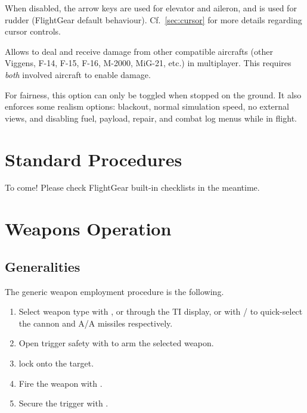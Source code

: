 \documentclass[a4paper]{report}
\begin{document}
\begin{description}
    When disabled, the arrow keys are used for elevator and aileron,
    and \keys{\return} is used for rudder (FlightGear default behaviour).
    Cf.\ \cref{sec:cursor} for more details regarding cursor controls.
  \item[\menu{Enable multiplayer damage}]
    Allows to deal and receive damage from other compatible aircrafts
    (other Viggens, F-14, F-15, F-16, M-2000, MiG-21, etc.) in multiplayer.
    This requires \emph{both} involved aircraft to enable damage.

    For fairness, this option can only be toggled when stopped on the ground.
    It also enforces some realism options: blackout, normal simulation speed,
    no external views, and disabling fuel, payload, repair, and combat log menus while in flight.
\end{description}


\chapter{Standard Procedures}
To come! Please check FlightGear built-in checklists
 in the meantime.


\chapter{Weapons Operation}
\label{chap:weapons}
\section{Generalities}
The generic weapon employment procedure is the following.
\begin{enumerate}
  \item Select weapon type with ,
    {or through the TI display, or with  / 
     to quick-select the cannon and A/A missiles respectively.}
  \item Open trigger safety with  to arm the selected weapon.
  \item {} lock onto the target.
  \item Fire the weapon with .
  \item Secure the trigger with .
\end{enumerate}
\end{document}
